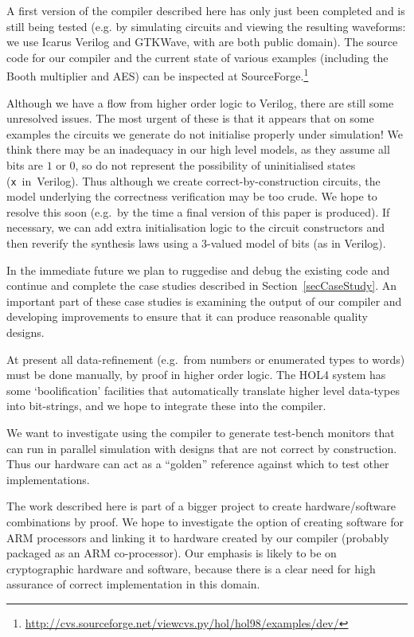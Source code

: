 

A first version of the compiler described here has only just been
completed and is still being tested (e.g. by simulating circuits and
viewing the resulting waveforms: we use Icarus Verilog and GTKWave,
with are both public domain).  The source code for our compiler and
the current state of various examples (including the Booth multiplier
and AES) can be inspected at
SourceForge.\footnote{\url{http://cvs.sourceforge.net/viewcvs.py/hol/hol98/examples/dev/}}

Although we have a flow from higher
order logic to Verilog, there are still some unresolved issues. The
most urgent of these is that it appears that on some examples the
circuits we generate do not initialise properly under simulation!  We
think there may be an inadequacy in our high level models, as they
assume all bits are $1$ or $0$, so do not represent the possibility of
uninitialised states (\texttt{x}~in~Verilog). Thus although we create
correct-by-construction circuits, the model underlying the correctness
verification may be too crude. We hope to resolve this soon (e.g.~by
the time a final version of this paper is produced). If necessary, we
can add extra initialisation logic to the circuit constructors and
then reverify the synthesis laws using a 3-valued model of bits
(as in Verilog).



In the immediate future we plan to ruggedise and debug the existing
code and continue and complete the case studies described in
Section~\ref{secCaseStudy}. An important part of these case studies is
examining the output of our compiler and developing improvements to
ensure that it can produce reasonable quality designs.

At present all data-refinement (e.g.~from numbers or enumerated types
to words) must be done manually, by proof in higher order logic. The
HOL4 system has some `boolification' facilities that automatically
translate higher level data-types into bit-strings, and we hope to
integrate these into the compiler.

We want to investigate using the compiler to generate test-bench
monitors that can run in parallel simulation with designs that are not
correct by construction.  Thus our hardware can act as a ``golden''
reference against which to test other implementations.

The work described here is part of a bigger project to create
hardware/software combinations by proof.  We hope to investigate the
option of creating software for ARM processors and linking it to
hardware created by our compiler (probably packaged as an ARM
co-processor). Our emphasis is likely to be on cryptographic hardware
and software, because there is a clear need for high assurance of
correct implementation in this domain.
